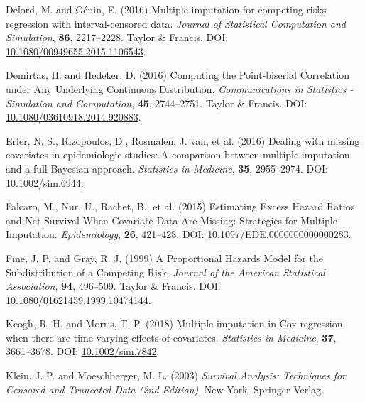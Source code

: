 \documentclass[
  letterpaper,
  DIV=11,
  numbers=noendperiod]{scrreprt}
\newlength{\cslhangindent}
\newlength{\cslentryspacingunit} %
\newenvironment{CSLReferences}[2] %
 {%
  \setlength{\parindent}{0pt}
  \ifodd #1
  \let\oldpar\par
  \def\par{\hangindent=\cslhangindent\oldpar}
  \fi
  \setlength{\parskip}{#2\cslentryspacingunit}
 }%
 {}
\begin{document}
\begin{CSLReferences}{1}{0}
\leavevmode{}%
Delord, M. and Génin, E. (2016) Multiple imputation for competing risks
regression with interval-censored data. \emph{Journal of Statistical
Computation and Simulation}, \textbf{86}, 2217--2228. Taylor \& Francis.
DOI:
\href{https://doi.org/10.1080/00949655.2015.1106543}{10.1080/00949655.2015.1106543}.

\leavevmode{}%
Demirtas, H. and Hedeker, D. (2016) Computing the {Point-biserial
Correlation} under {Any Underlying Continuous Distribution}.
\emph{Communications in Statistics - Simulation and Computation},
\textbf{45}, 2744--2751. Taylor \& Francis. DOI:
\href{https://doi.org/10.1080/03610918.2014.920883}{10.1080/03610918.2014.920883}.

\leavevmode{}%
Erler, N. S., Rizopoulos, D., Rosmalen, J. van, et al. (2016) Dealing
with missing covariates in epidemiologic studies: A comparison between
multiple imputation and a full {Bayesian} approach. \emph{Statistics in
Medicine}, \textbf{35}, 2955--2974. DOI:
\href{https://doi.org/10.1002/sim.6944}{10.1002/sim.6944}.

\leavevmode{}%
Falcaro, M., Nur, U., Rachet, B., et al. (2015) Estimating {Excess
Hazard Ratios} and {Net Survival When Covariate Data Are Missing}:
{Strategies} for {Multiple Imputation}. \emph{Epidemiology},
\textbf{26}, 421--428. DOI:
\href{https://doi.org/10.1097/EDE.0000000000000283}{10.1097/EDE.0000000000000283}.

\leavevmode{}%
Fine, J. P. and Gray, R. J. (1999) A {Proportional Hazards Model} for
the {Subdistribution} of a {Competing Risk}. \emph{Journal of the
American Statistical Association}, \textbf{94}, 496--509. Taylor \&
Francis. DOI:
\href{https://doi.org/10.1080/01621459.1999.10474144}{10.1080/01621459.1999.10474144}.

\leavevmode{}%
Keogh, R. H. and Morris, T. P. (2018) Multiple imputation in {Cox}
regression when there are time-varying effects of covariates.
\emph{Statistics in Medicine}, \textbf{37}, 3661--3678. DOI:
\href{https://doi.org/10.1002/sim.7842}{10.1002/sim.7842}.

\leavevmode{}%
Klein, J. P. and Moeschberger, M. L. (2003) \emph{Survival Analysis:
{Techniques} for Censored and Truncated Data (2nd Edition)}. New York:
Springer-Verlag.


\end{CSLReferences}
\end{document}
